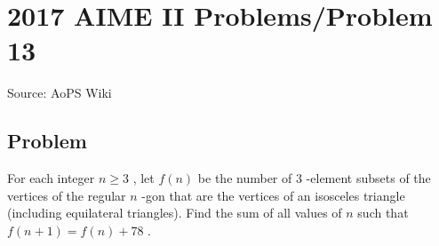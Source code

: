 \documentclass[12pt]{article}
\begin{document}
\section*{{2017 AIME II Problems/Problem 13}}
Source: AoPS Wiki

\subsection*{Problem}
For each integer $n\geq3$ , let $f(n)$ be the number of $3$ -element subsets of the vertices of the regular $n$ -gon that are the vertices of an isosceles triangle (including equilateral triangles). Find the sum of all values of $n$ such that $f(n+1)=f(n)+78$ .
\end{document}
